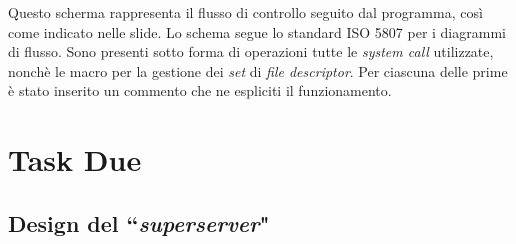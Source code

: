 \documentclass[a4paper, 12pt]{report}
\begin{document}
Questo scherma rappresenta il flusso di controllo seguito dal programma, così come indicato nelle slide. Lo schema segue lo standard ISO 5807 per i diagrammi di flusso. Sono presenti
sotto forma di operazioni tutte le \textit{system call} utilizzate, nonchè le macro per la gestione dei \textit{set} di \textit{file descriptor}. Per ciascuna delle prime è stato inserito
un commento che ne espliciti il funzionamento.

\chapter{Task Due}

\section{Design del ``\textit{superserver}"}
\end{document}

